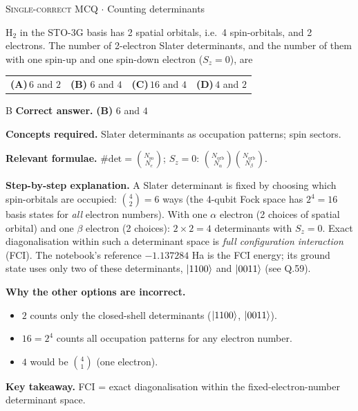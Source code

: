 \documentclass[11pt,a4paper]{article}
\newcommand{\optlabel}[1]{\textbf{(#1)}}
\newcommand{\correctlabel}[1]{\textcolor{okgreen}{\textbf{(#1)}\,\ding{51}}}
\newenvironment{qitem}[1]{\begin{list}{}{\setlength{\leftmargin}{3.3em}\setlength{\labelwidth}{3.1em}%
  \setlength{\labelsep}{0.2em}\setlength{\topsep}{3pt}\setlength{\parsep}{3pt}}\item[\textbf{Q.#1}\hfill]}{\end{list}}
\newcommand{\qsep}{\par\vspace{2pt}{\color{black!15}\hrule}\vspace{4pt}}
\newcommand{\qmeta}[2]{{\footnotesize\color{black!60}\textsc{#1} \;$\cdot$\; #2}\par}
\begin{document}
\begin{qitem}{9}
\qmeta{Single-correct MCQ}{Counting determinants}
H$_2$ in the STO-3G basis has 2 spatial orbitals, i.e.\ 4 spin-orbitals, and 2 electrons. The number of 2-electron Slater determinants,
and the number of them with one spin-up and one spin-down electron ($S_z = 0$), are
\par\smallskip\noindent\begin{tabularx}{\linewidth}{@{}*{4}{L}@{}}
\optlabel{A}\,$6$ and $2$ & \correctlabel{B}\,$6$ and $4$ & \optlabel{C}\,$16$ and $4$ & \optlabel{D}\,$4$ and $2$
\end{tabularx}
\end{qitem}
\begin{solbox}{B}
\textbf{\color{brand}Correct answer.} \textcolor{okgreen}{\textbf{(B)}} $6$ and $4$

\textbf{\color{brand}Concepts required.} Slater determinants as occupation patterns; spin sectors.

\textbf{\color{brand}Relevant formulae.} $\#\text{det} = \binom{N_{\mathrm{so}}}{N_e}$; $S_z = 0$: $\binom{N_{\mathrm{orb}}}{N_\alpha}\binom{N_{\mathrm{orb}}}{N_\beta}$.

\textbf{\color{brand}Step-by-step explanation.} A Slater determinant is fixed by choosing which spin-orbitals are occupied: $\binom{4}{2} = 6$ ways (the 4-qubit Fock space has $2^4 = 16$
basis states for \emph{all} electron numbers). With one $\alpha$ electron (2 choices of spatial orbital) and one $\beta$ electron (2 choices):
$2\times2 = 4$ determinants with $S_z = 0$. Exact diagonalisation within such a determinant space is \emph{full configuration
interaction} (FCI). The notebook's reference $-1.137284$ Ha is the FCI energy; its ground state uses only two of these
determinants, $\ket{1100}$ and $\ket{0011}$ (see Q.59).

\textbf{\color{brand}Why the other options are incorrect.}
\begin{itemize}[leftmargin=2.4em, itemsep=1pt, topsep=2pt]
\item[\textbf{(A)}] $2$ counts only the closed-shell determinants ($\ket{1100}$, $\ket{0011}$).
\item[\textbf{(C)}] $16 = 2^4$ counts all occupation patterns for any electron number.
\item[\textbf{(D)}] $4$ would be $\binom41$ (one electron).
\end{itemize}
\textbf{\color{brand}Key takeaway.} FCI = exact diagonalisation within the fixed-electron-number determinant space.
\end{solbox}
\qsep
\end{document}
